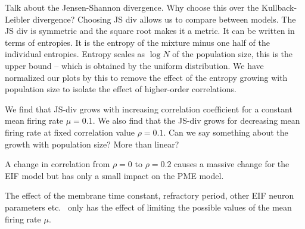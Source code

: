 \documentclass[%
 reprint,
 amsmath,amssymb,
 aps,
floatfix,
]{revtex4-1}
\begin{document}

Talk about the Jensen-Shannon divergence. Why choose this over the Kullback-Leibler divergence? Choosing JS div allows us to compare between models. The JS div is symmetric and the square root makes it a metric. It can be written in terms of entropies. It is the entropy of the mixture minus one half of the individual entropies. Entropy scales as $\log{N}$ of the population size, this is the upper bound -- which is obtained by the uniform distribution. We have normalized our plots by this to remove the effect of the entropy growing with population size to isolate the effect of higher-order correlations.

We find that JS-div grows with increasing correlation coefficient for a constant mean firing rate $\mu = 0.1$. We also find that the JS-div grows for decreasing mean firing rate at fixed correlation value $\rho = 0.1$. Can we say something about the growth with population size? More than linear?

A change in correlation from $\rho = 0$ to $\rho = 0.2$ causes a massive change for the EIF model but has only a small impact on the PME model.

The effect of the membrane time constant, refractory period, other EIF neuron parameters etc.~ only has the effect of limiting the possible values of the mean firing rate $\mu$. \colorbox{BrickRed}{\color{White}{Incomplete.}}

\end{document}
